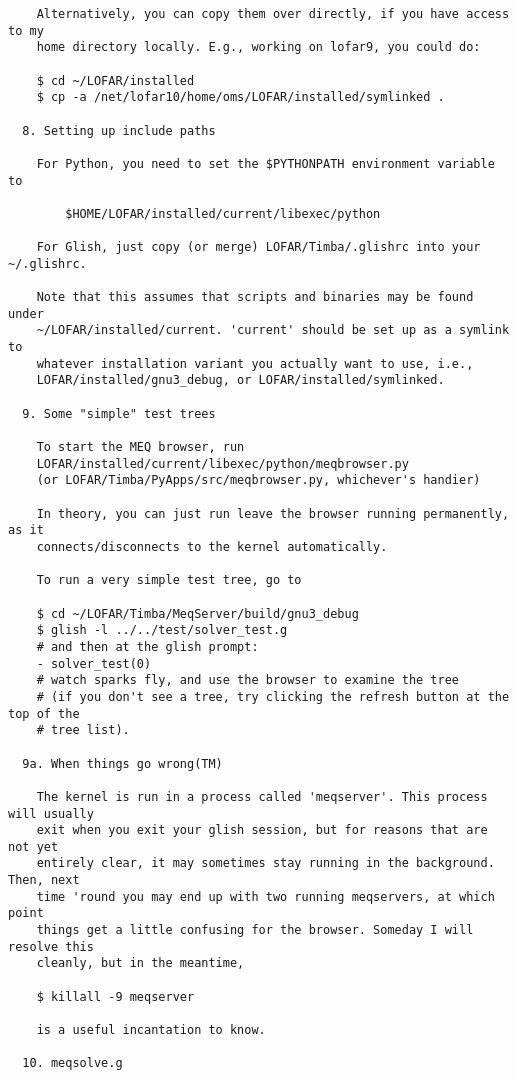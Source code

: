 \documentclass[10pt]{article}
\begin{document}
\begin{verbatim}
    Alternatively, you can copy them over directly, if you have access to my
    home directory locally. E.g., working on lofar9, you could do:

    $ cd ~/LOFAR/installed
    $ cp -a /net/lofar10/home/oms/LOFAR/installed/symlinked .

  8. Setting up include paths

    For Python, you need to set the $PYTHONPATH environment variable to

        $HOME/LOFAR/installed/current/libexec/python

    For Glish, just copy (or merge) LOFAR/Timba/.glishrc into your ~/.glishrc.

    Note that this assumes that scripts and binaries may be found under
    ~/LOFAR/installed/current. 'current' should be set up as a symlink to
    whatever installation variant you actually want to use, i.e.,
    LOFAR/installed/gnu3_debug, or LOFAR/installed/symlinked.

  9. Some "simple" test trees

    To start the MEQ browser, run 
    LOFAR/installed/current/libexec/python/meqbrowser.py
    (or LOFAR/Timba/PyApps/src/meqbrowser.py, whichever's handier)

    In theory, you can just run leave the browser running permanently, as it
    connects/disconnects to the kernel automatically.

    To run a very simple test tree, go to 

    $ cd ~/LOFAR/Timba/MeqServer/build/gnu3_debug
    $ glish -l ../../test/solver_test.g
    # and then at the glish prompt:
    - solver_test(0)
    # watch sparks fly, and use the browser to examine the tree
    # (if you don't see a tree, try clicking the refresh button at the top of the
    # tree list).

  9a. When things go wrong(TM)

    The kernel is run in a process called 'meqserver'. This process will usually
    exit when you exit your glish session, but for reasons that are not yet 
    entirely clear, it may sometimes stay running in the background. Then, next
    time 'round you may end up with two running meqservers, at which point
    things get a little confusing for the browser. Someday I will resolve this
    cleanly, but in the meantime,

    $ killall -9 meqserver

    is a useful incantation to know.

  10. meqsolve.g


\end{verbatim}
\end{document}
